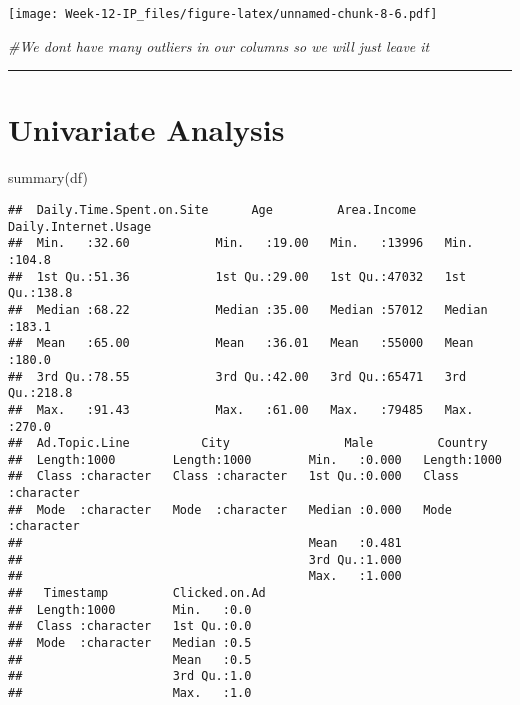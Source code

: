 \documentclass[
]{article}
\newenvironment{Shaded}{\begin{snugshade}}{\end{snugshade}}
\newcommand{\CommentTok}[1]{\textcolor[rgb]{0.56,0.35,0.01}{\textit{#1}}}
\newcommand{\FunctionTok}[1]{\textcolor[rgb]{0.00,0.00,0.00}{#1}}
\newcommand{\NormalTok}[1]{#1}
\begin{document}
\texttt{[image: Week-12-IP\_files/figure-latex/unnamed-chunk-8-6.pdf]}

\begin{Shaded}
\begin{Highlighting}[]
\CommentTok{\#We dont have many outliers in our columns so we will just leave it }
\end{Highlighting}
\end{Shaded}

\begin{center}\rule{0.5\linewidth}{0.5pt}\end{center}

\hypertarget{univariate-analysis}{%
\section{Univariate Analysis}\label{univariate-analysis}}

\begin{Shaded}
\begin{Highlighting}[]
\FunctionTok{summary}\NormalTok{(df)}
\end{Highlighting}
\end{Shaded}

\begin{verbatim}
##  Daily.Time.Spent.on.Site      Age         Area.Income    Daily.Internet.Usage
##  Min.   :32.60            Min.   :19.00   Min.   :13996   Min.   :104.8       
##  1st Qu.:51.36            1st Qu.:29.00   1st Qu.:47032   1st Qu.:138.8       
##  Median :68.22            Median :35.00   Median :57012   Median :183.1       
##  Mean   :65.00            Mean   :36.01   Mean   :55000   Mean   :180.0       
##  3rd Qu.:78.55            3rd Qu.:42.00   3rd Qu.:65471   3rd Qu.:218.8       
##  Max.   :91.43            Max.   :61.00   Max.   :79485   Max.   :270.0       
##  Ad.Topic.Line          City                Male         Country         
##  Length:1000        Length:1000        Min.   :0.000   Length:1000       
##  Class :character   Class :character   1st Qu.:0.000   Class :character  
##  Mode  :character   Mode  :character   Median :0.000   Mode  :character  
##                                        Mean   :0.481                     
##                                        3rd Qu.:1.000                     
##                                        Max.   :1.000                     
##   Timestamp         Clicked.on.Ad
##  Length:1000        Min.   :0.0  
##  Class :character   1st Qu.:0.0  
##  Mode  :character   Median :0.5  
##                     Mean   :0.5  
##                     3rd Qu.:1.0  
##                     Max.   :1.0
\end{verbatim}
\end{document}

